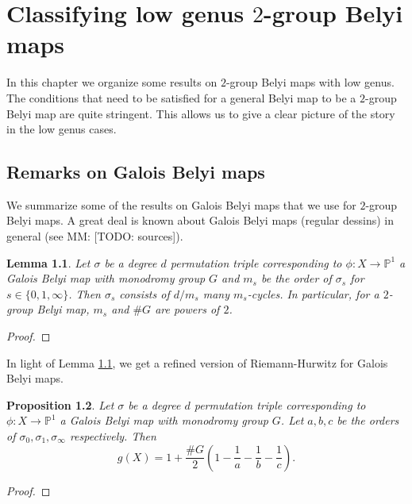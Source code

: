 \documentclass{dcthesis}
\newcommand{\PP}{\mathbb P}
\newcommand{\mm}[1]{{\color{blue} \sf MM: [#1]}}
\newtheorem{prop}{Proposition}[section]
\newtheorem{lemma}[prop]{Lemma}
\theoremstyle{definition}
\theoremstyle{remark}
\numberwithin{equation}{section}
\numberwithin{figure}{section}
\begin{document}
\chapter{Classifying low genus $2$-group Belyi maps}{\label{chapter:classify}
  In this chapter we organize some results on $2$-group Belyi maps
  with low genus.
  The conditions that need to be satisfied for a general Belyi map
  to be a $2$-group Belyi map are quite stringent.
  This allows us to give a clear picture of the story in the low genus cases.
  \section{Remarks on Galois Belyi maps}{\label{sec:galoisbelyimaps}
    We summarize some of the results on Galois Belyi maps
    that we use for $2$-group Belyi maps.
    A great deal is known about Galois Belyi maps (regular dessins) in general
    (see \mm{TODO: sources}).
    \begin{lemma}\label{lem:regular}
      Let $\sigma$ be a degree $d$ permutation triple corresponding to
      $\phi\colon X\to\PP^1$ a Galois Belyi map with monodromy group $G$
      and
      $m_s$ be the order of $\sigma_s$ for $s\in\{0,1,\infty\}$.
      Then $\sigma_s$ consists of $d/m_s$ many $m_s$-cycles.
      In particular,
      for a $2$-group Belyi map,
      $m_s$ and $\#G$ are powers of $2$.
    \end{lemma}
    \begin{proof}
    \end{proof}
    In light of Lemma \ref{lem:regular},
    we get a refined version of Riemann-Hurwitz for Galois Belyi maps.
    \begin{prop}\label{prop:riemannhurwitzgalois}
      Let $\sigma$ be a degree $d$ permutation triple corresponding to
      $\phi\colon X\to\PP^1$ a Galois Belyi map with monodromy group $G$.
      Let $a,b,c$ be the orders of $\sigma_0,\sigma_1,\sigma_\infty$
      respectively.
      Then
      \begin{equation}\label{eqn:riemannhurwitzgalois}
        g(X) = 1+\frac{\#G}{2}\left(1-\frac{1}{a}-\frac{1}{b}-\frac{1}{c}\right).
      \end{equation}
    \end{prop}
    \begin{proof}
    \end{proof}
  }
}
\end{document}
